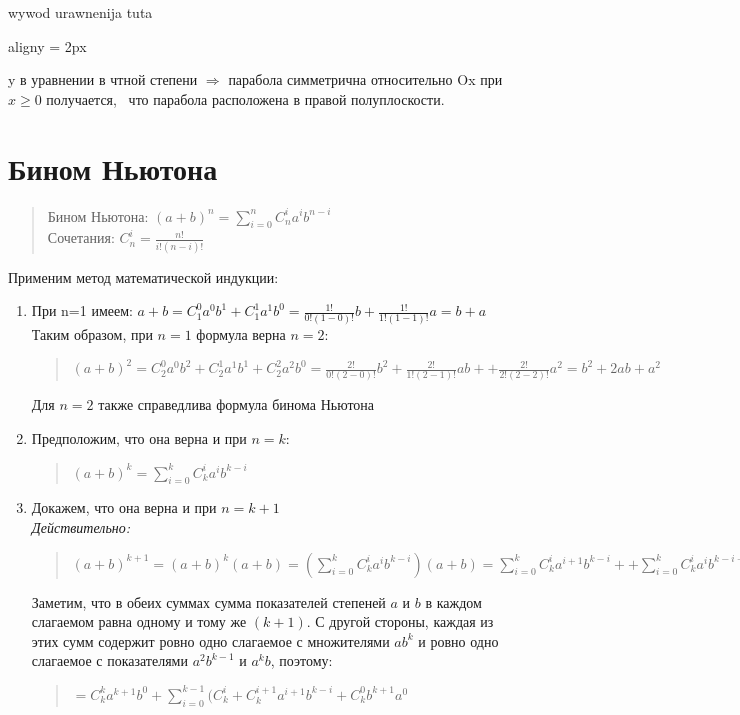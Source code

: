 \documentclass[oneside]{book}
\newcommand{\boxedeq}[2]{\begin{empheq}[box={\fboxsep=6pt\fbox}]{align}\label{#1}#2\end{empheq}}
\begin{document}
\begin{enumerate}
\begin{center}
    wywod urawnenija tuta

    \boxedeq{eq:*}{y = \pm 2px}
\end{center}
y в уравнении в чтной степени $\Rightarrow$ парабола симметрична относительно Ox при $x \geq 0$ получается, \
что парабола расположена в правой полуплоскости.
\setcounter{chapter}{3}
\chapter{Бином Ньютона}
\begin{quote}
	Бином Ньютона:
	$(a+b)^n=\sum\limits_{i=0}^nC_{n}^ia^ib^{n-i}$\\
	Сочетания: $C_{n}^i= \frac{n!}{i!(n-i)!} $
\end{quote}
Применим метод математической индукции:

\begin{enumerate}
	\item При n=1 имеем:
	$a+b=C_{1}^0a^0b^1+C_{1}^1a^1b^0=\frac{1!}{0!(1-0)!}b+\frac{1!}{1!(1-1)!}a=b+a$
	Таким образом, при $n=1$ формула верна
	 $n = 2$:
	\begin{quote}
		$(a+b)^2=C_2^0a^0b^2+C_2^1a^1b^1+C_2^2a^2b^0=\frac{2!}{0!(2-0)!}b^2+\frac{2!}{1!(2-1)!}ab++\frac{2!}{2!(2-2)!}a^2=b^2+2ab+a^2$
	\end{quote}
		Для $n=2$ также справедлива формула бинома Ньютона
	\item Предположим, что она верна и при $n=k$:
	\begin{quote}
		$(a+b)^k=\sum\limits_{i=0}^kC_{k}^ia^ib^{k-i}$
	\end{quote}
	\item Докажем, что она верна и при $n=k+1$\\\textit{Действительно:}
	\begin{quote}
	$(a+b)^{k+1}=(a+b)^k(a+b)=(\sum\limits_{i=0}^kC_{k}^ia^ib^{k-i})(a+b)=\sum\limits_{i=0}^kC_{k}^ia^{i+1}b^{k-i}++\sum\limits_{i=0}^kC_{k}^ia^ib^{k-i+1}=C_k^ka^{k+1}b^{0} + \sum\limits_{i=0}^{k-1}C_k^ia^{i+1}b^{k-i}+\sum\limits_{i=1}^{k}C_k^ia^{i}b^{k-i+1} + C_k^0b^{k+1}a^0=$
	\end{quote}
Заметим, что в обеих суммах сумма показателей степеней $a$ и $b$ в каждом слагаемом равна одному и тому же $(k+1)$. С другой стороны, каждая из этих сумм содержит ровно одно слагаемое с множителями $ab^k$ и ровно одно слагаемое с показателями $a^2b^{k-1}$ и $a^kb$, поэтому:
\begin{quote}$=C_k^ka^{k+1}b^{0} + \sum\limits_{i=0}^{k-1}(C_k^i + C_k^{i+1} a^{i+1}b^{k-i}+C_k^0b^{k+1}a^0$

\end{quote}
\end{enumerate}
\end{enumerate}
\end{document}
